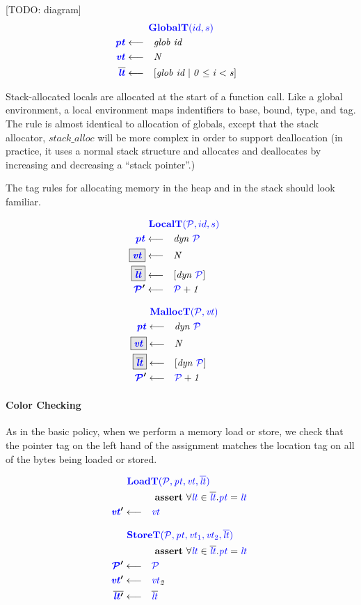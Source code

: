 \documentclass[acmsmall,review,anonymous]{acmart}\settopmatter{printfolios=true,printccs=false,printacmref=false}
\begin{document}
[TODO: diagram]
\[\begin{aligned}
\truledef{\globalt}
\settag{\pt}{\mathit{glob ~ id}}
\settag{\vt}{N}
\settag{\overline{\lt}}{\left[\mathit{glob} ~ id \mid 0 \leq i < s\right]}
\end{aligned}\]

Stack-allocated locals are allocated at the start of a function call. Like a global environment,
a local environment maps indentifiers to base, bound, type, and tag. The rule is almost identical
to allocation of globals, except that the stack allocator, \(\mathit{stack\_alloc}\) will be more
complex in order to support deallocation (in practice, it uses a normal stack structure and allocates
and deallocates by increasing and decreasing a ``stack pointer''.)

The tag rules for allocating memory in the heap and in the stack should look familiar.

\begin{minipage}{0.49\textwidth}
\[\begin{aligned}
\truledef{\localt}
\settag{\pt}{dyn ~ \PCT}
\settagopt{\vt}{N}
\settagopt{\overline{\lt}}{\left[dyn ~ \PCT\right]}
\settag{\PCT'}{\PCT+1}
\end{aligned}\]
\end{minipage}
\begin{minipage}{0.49\textwidth}
\[\begin{aligned}
\truledef{\malloct}
\settag{\pt}{dyn ~ \PCT}
\settagopt{\vt}{N}
\settagopt{\overline{\lt}}{\left[dyn ~ \PCT\right]}
\settag{\PCT'}{\PCT + 1}
\end{aligned}\]
\end{minipage}

\paragraph*{Color Checking}

As in the basic policy, when we perform a memory load or store, we check that the pointer tag
on the left hand of the assignment matches the location tag on all of the bytes being loaded or stored.

\begin{minipage}{0.49\textwidth}
\[\begin{aligned}
\truledef{\loadt}
\assert{\forall \lt \in \overline{\lt} . \pt = \lt}
\settag{\vt'}{\vt}
\end{aligned}\]
\end{minipage}
\begin{minipage}{0.49\textwidth}
\[\begin{aligned}
\truledef{\storet}
\assert{\forall \lt \in \overline{\lt} . \pt = \lt}
\settag{\PCT'}{\PCT}
\settag{\vt'}{\vt_2}
\settag{\overline{\lt'}}{\overline{\lt}}
\end{aligned}\]
\end{minipage}
\end{document}

